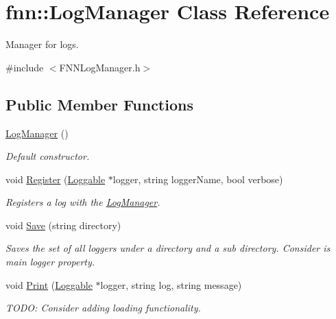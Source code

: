 \hypertarget{classfnn_1_1_log_manager}{}\section{fnn\+:\+:Log\+Manager Class Reference}
\label{classfnn_1_1_log_manager}


Manager for logs.  




{\ttfamily \#include $<$F\+N\+N\+Log\+Manager.\+h$>$}

\subsection*{Public Member Functions}
\begin{DoxyCompactItemize}
\item 
\hyperlink{classfnn_1_1_log_manager_abb503c00777cd118edcf19bbb454b924}{Log\+Manager} ()
\begin{DoxyCompactList}\small\item\em Default constructor. \end{DoxyCompactList}\item 
void \hyperlink{classfnn_1_1_log_manager_a2af8bce7343fec5db9fe72443dbcdd65}{Register} (\hyperlink{classfnn_1_1_loggable}{Loggable} $\ast$logger, string logger\+Name, bool verbose)
\begin{DoxyCompactList}\small\item\em Registers a log with the \hyperlink{classfnn_1_1_log_manager}{Log\+Manager}. \end{DoxyCompactList}\item 
void \hyperlink{classfnn_1_1_log_manager_aee9f210a5a009e6f042656132ce67287}{Save} (string directory)
\begin{DoxyCompactList}\small\item\em Saves the set of all loggers under a directory and a sub directory. Consider is main logger property. \end{DoxyCompactList}\item 
void \hyperlink{classfnn_1_1_log_manager_a5f42cf3d05411c4d66202a823e3c6d55}{Print} (\hyperlink{classfnn_1_1_loggable}{Loggable} $\ast$logger, string log, string message)
\begin{DoxyCompactList}\small\item\em T\+O\+D\+O\+: Consider adding loading functionality. \end{DoxyCompactList}\end{DoxyCompactItemize}


